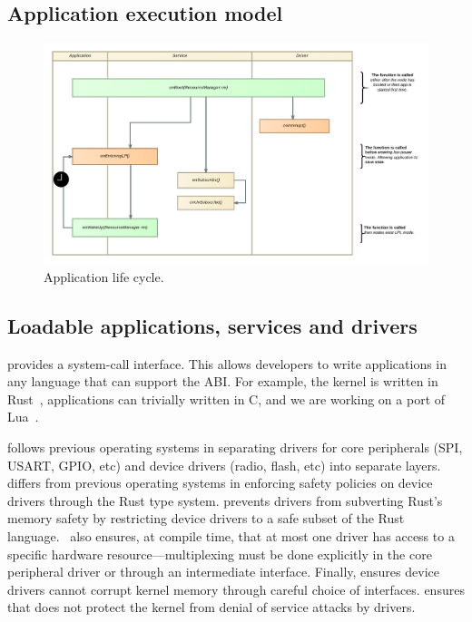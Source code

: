 \subsection{Application execution model}
\begin{figure}
 \centering
\includegraphics[width=1\columnwidth]{img/appcycle.png}
\caption{Application life cycle.}
 \label{fig:appcycle}
\end{figure}


\subsection{Loadable applications, services and drivers}

\name provides a system-call interface. This
allows developers to write applications in any language that can support the
ABI. For example, the \name kernel is written in Rust~\cite{rust}, applications
can trivially written in C, and we are working on a port of Lua~\cite{lua}.

 \name follows previous operating systems in separating
drivers for core peripherals (SPI, USART, GPIO, etc) and device drivers (radio,
flash, etc) into separate layers. \name differs from previous operating systems
in enforcing safety policies on device drivers through the Rust type system.
\name prevents drivers from subverting Rust's memory safety by restricting
device drivers to a safe subset of the Rust language.~ \name
also ensures, at compile time, that at most one driver has access to a specific
hardware resource---multiplexing must be done explicitly in the core peripheral
driver or through an intermediate interface. Finally, \name ensures device
drivers cannot corrupt kernel memory through careful choice of interfaces. \name
ensures that \name does not protect the kernel from denial of service attacks by
drivers.

